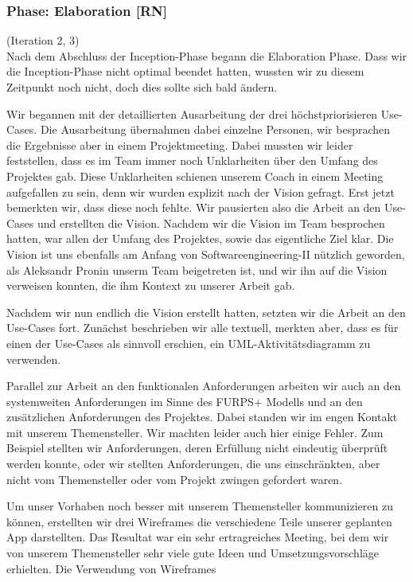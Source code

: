 \documentclass[10pt]{article}
\begin{document}
\subsubsection{Phase: Elaboration [RN]}
(Iteration 2, 3)\\
Nach dem Abschluss der Inception-Phase begann die Elaboration Phase. Dass wir die Inception-Phase nicht optimal
beendet hatten, wussten wir zu diesem Zeitpunkt noch nicht, doch dies sollte sich bald ändern.\par
\medskip
Wir begannen mit der detaillierten Ausarbeitung der drei höchstpriorisieren Use-Cases. Die Ausarbeitung übernahmen
dabei einzelne Personen, wir besprachen die Ergebnisse aber in einem Projektmeeting. Dabei mussten wir leider feststellen,
dass es im Team immer noch Unklarheiten über den Umfang des Projektes gab. Diese Unklarheiten schienen unserem Coach
in einem Meeting aufgefallen zu sein, denn wir wurden explizit nach der Vision gefragt. Erst jetzt bemerkten wir,
dass diese noch fehlte. Wir pausierten also die Arbeit an den Use-Cases und erstellten die Vision. Nachdem wir die
Vision im Team besprochen hatten, war allen der Umfang des Projektes, sowie das eigentliche Ziel klar. Die Vision
ist uns ebenfalls am Anfang von Softwareengineering-II nützlich geworden, als Aleksandr Pronin unserm Team
beigetreten ist, und wir ihn auf die Vision verweisen konnten, die ihm Kontext zu unserer Arbeit gab.\par
\medskip
Nachdem wir nun endlich die Vision erstellt hatten, setzten wir die Arbeit an den Use-Cases fort.
Zunächst beschrieben wir alle textuell, merkten aber, dass es für einen der Use-Cases als sinnvoll erschien, ein UML-Aktivitätsdiagramm
zu verwenden.\par
\medskip
Parallel zur Arbeit an den funktionalen Anforderungen arbeiten wir auch an den
systemweiten Anforderungen im Sinne des FURPS+ Modells und an den zusätzlichen Anforderungen des Projektes.
Dabei standen wir im engen Kontakt mit unserem Themensteller. Wir machten leider auch hier einige Fehler.
Zum Beispiel stellten wir Anforderungen, deren Erfüllung nicht eindeutig überprüft werden konnte, oder wir
stellten Anforderungen, die uns einschränkten, aber nicht vom Themensteller oder vom Projekt zwingen gefordert waren.\par
\medskip
Um unser Vorhaben noch besser mit unserem Themensteller kommunizieren zu können, erstellten wir drei Wireframes
die verschiedene Teile unserer geplanten App darstellten. Das Resultat war ein sehr ertragreiches Meeting, bei dem
wir von unserem Themensteller sehr viele gute Ideen und Umsetzungsvorschläge erhielten. Die Verwendung von Wireframes
\end{document}
